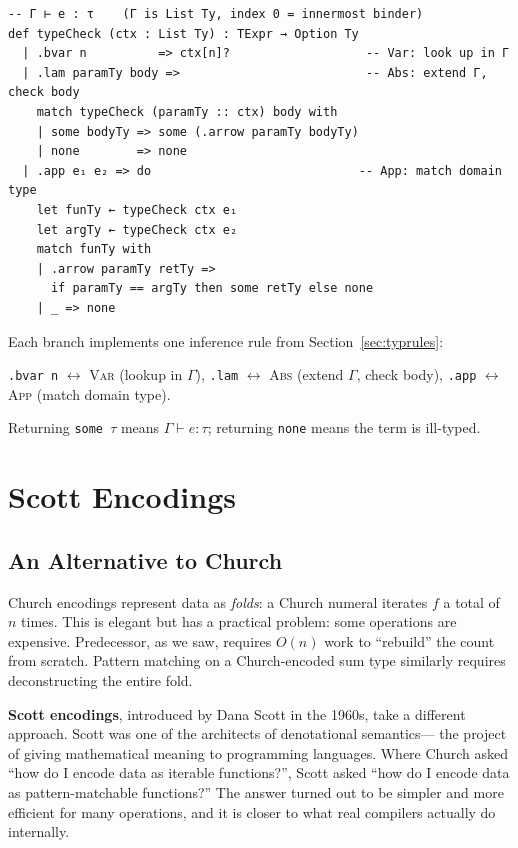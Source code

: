 \documentclass[11pt,a4paper]{article}
\theoremstyle{definition}
\newcommand{\proves}{\vdash}
\begin{document}
\begin{verbatim}
-- Γ ⊢ e : τ    (Γ is List Ty, index 0 = innermost binder)
def typeCheck (ctx : List Ty) : TExpr → Option Ty
  | .bvar n          => ctx[n]?                   -- Var: look up in Γ
  | .lam paramTy body =>                          -- Abs: extend Γ, check body
    match typeCheck (paramTy :: ctx) body with
    | some bodyTy => some (.arrow paramTy bodyTy)
    | none        => none
  | .app e₁ e₂ => do                             -- App: match domain type
    let funTy ← typeCheck ctx e₁
    let argTy ← typeCheck ctx e₂
    match funTy with
    | .arrow paramTy retTy =>
      if paramTy == argTy then some retTy else none
    | _ => none
\end{verbatim}

\begin{intuition}
Each branch implements one inference rule from Section~\ref{sec:typrules}:

\texttt{.bvar n} $\leftrightarrow$ \textsc{Var} (lookup in $\Gamma$), \quad
\texttt{.lam} $\leftrightarrow$ \textsc{Abs} (extend $\Gamma$, check body), \quad
\texttt{.app} $\leftrightarrow$ \textsc{App} (match domain type).

Returning \texttt{some $\tau$} means $\Gamma \proves e : \tau$;
returning \texttt{none} means the term is ill-typed.
\end{intuition}

\section{Scott Encodings}\label{sec:scott}

\subsection{An Alternative to Church}

Church encodings represent data as \emph{folds}: a Church numeral iterates
$f$ a total of $n$ times. This is elegant but has a practical problem:
some operations are expensive. Predecessor, as we saw, requires $O(n)$ work
to ``rebuild'' the count from scratch. Pattern matching on a Church-encoded
sum type similarly requires deconstructing the entire fold.

\textbf{Scott encodings}, introduced by Dana Scott in the 1960s, take a
different approach. Scott was one of the architects of denotational semantics---
the project of giving mathematical meaning to programming languages. Where
Church asked ``how do I encode data as iterable functions?'', Scott asked
``how do I encode data as pattern-matchable functions?'' The answer turned out
to be simpler and more efficient for many operations, and it is closer to
what real compilers actually do internally.
\end{document}
